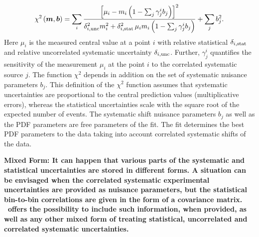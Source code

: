 \begin{description}
{ \small
\begin{equation} 
    \chi^2\left(\boldsymbol{m},\boldsymbol{b}\right) =   
 \sum_i \frac{\left[ {\mu_i} - m_i \left( 1 - \sum_j \gamma^i_j b_j \right) \right]^2}
{ \textstyle \delta^2_{i,{\rm unc}}m_i^2 + \delta^2_{i,{\rm stat}}\, {\mu_i} m_i \left(1 - \sum_j \gamma^i_j b_j\right) }
  + \sum_j b^2_j.
\label{eq:aven}
\end{equation}}
%
Here ${\mu_i}$ is the  measured central value  at a point $i$ 
with  relative statistical $\delta_{i,\rm stat}$ 
and relative uncorrelated systematic uncertainty $\delta_{i,\rm unc}$.
Further, 
$\gamma^i_j$ 
quantifies the sensitivity of the
measurement ${\mu_i}$ at the point $i$ to the correlated systematic 
source $j$. The function $\chi^2$ depends in addition on
 the set of systematic nuisance parameters $b_j$.
This definition of the $\chi^2$ function assumes that
systematic uncertainties are proportional to the central prediction values
(multiplicative errors), whereas the statistical uncertainties scale 
with the square root of the expected number of events. 
The systematic shift nuisance parameters $b_j$ as well as the PDF 
parameters are free parameters of the fit. 
The fit determines the best PDF parameters to
the data taking into account correlated systematic shifts of the data. 
\item  \bf{Mixed Form:} \rm
It can happen that various parts of the systematic and statistical uncertainties are stored in different forms. A situation can be envisaged when the correlated systematic experimental uncertainties are provided as nuisance parameters, but the statistical bin-to-bin correlations are given in the form of a covariance matrix. \fitter\ offers the possibility to include such information, when provided, as well as any other mixed form of treating statistical, uncorrelated and correlated systematic uncertainties. 

\end{description}
